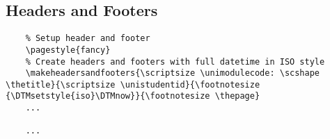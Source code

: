 \subsection{Headers and Footers}

\begin{listing}[H]
  \captionsetup{skip=\skiplistingcaptionlen}
  \begin{verbatim}
    % Setup header and footer
    \pagestyle{fancy}
    % Create headers and footers with full datetime in ISO style
    \makeheadersandfooters{\scriptsize \unimodulecode: \scshape \thetitle}{\scriptsize \unistudentid}{\footnotesize {\DTMsetstyle{iso}\DTMnow}}{\footnotesize \thepage}
    ...
    
    ...
  \end{verbatim}
  \caption{\LaTeX\ \texttt{\textbackslash makeheadersandfooters} command example}
  \label{example:lst:makeheadersandfooters}
\end{listing}

